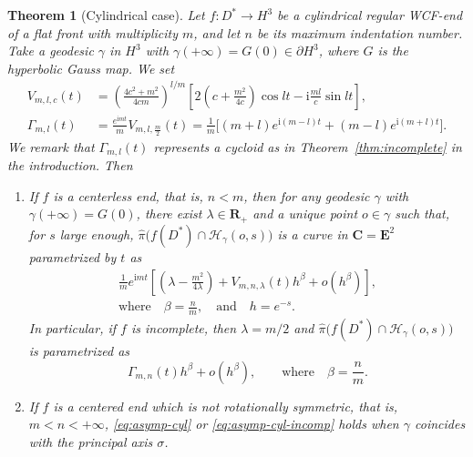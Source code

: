 \documentclass[a4paper]{amsart}
\theoremstyle{plain}
\newtheorem{theorem}{Theorem}[section]
\theoremstyle{remark}
\numberwithin{equation}{section}
\begin{document}
\begin{theorem}[Cylindrical case]\label{thm:cyl}
 Let $f\colon{}D^*\to H^3$ be a cylindrical regular WCF-end
 of a flat front
 with multiplicity $m$, and let $n$ be 
 its maximum indentation number.
 Take a geodesic $\gamma$ in $H^3$ with $\gamma(+\infty)=G(0)\in\partial H^3$,
 where $G$ is the hyperbolic Gauss map.
 We set
 \begin{equation}\label{eq:C}
 \begin{aligned}
    V_{m,l,c}(t) &=
     \left(
       \frac{4c^2+m^2}{4cm}
     \right)^{l/m}
     \left[
      2\left(c+\frac{m^2}{4c}\right)\cos lt - 
       {\mathrm{i}} \frac{ml}{c}\sin lt
     \right],\\
    {\varGamma}_{m,l}(t) &= \frac{e^{{\mathrm{i}} m t}}{m}
                        V_{m,l,\frac{m}{2}}(t)
             = \frac{1}{m}
                \bigl[(m+l)e^{{\mathrm{i}}(m-l)t}+
                      (m-l)e^{{\mathrm{i}}(m+l)t}\bigr].
 \end{aligned}
 \end{equation}
 We remark that ${\varGamma}_{m,l}(t)$ represents a cycloid 
 as in Theorem~\ref{thm:incomplete} in the introduction.
 Then
 \begingroup
 
 
 \begin{enumerate}
  \item\label{item:cyl-1}
       If $f$ is a centerless end, that is, $n<m$, then 
       for any geodesic $\gamma$ with $\gamma(+\infty)=G(0)$,
       there exist  $\lambda\in{\boldsymbol{R}}_+$ and 
       a unique point $o\in \gamma$ 
       such that, 
       for $s$ large enough, 
       $\hat\pi\bigl(f(D^*)\cap{\mathcal{H}}_{\gamma}(o,s)\bigr)$ 
       is a curve in ${\boldsymbol{C}}={\boldsymbol{E}}^2$
       parametrized by $t$ as
       \begin{multline}\label{eq:asymp-cyl}
	\frac{1}{m}e^{{\mathrm{i}} m t}
	 \left[
	  \left(\lambda-\frac{m^2}{4\lambda}\right)
	  +
	  V_{m,n,\lambda}(t)h^{\beta}
	    +o(h^\beta)
	 \right],\\
       \text{where}\quad
         \beta = \frac{n}{m}, \quad \text{and}
         \quad
         h = e^{-s}.
       \end{multline}
       In particular, if $f$ is incomplete, then $\lambda=m/2$ and 
       $\hat\pi\bigl(f(D^*)\cap{\mathcal{H}}_{\gamma}(o,s)\bigr)$ is
       parametrized as
       \begin{equation}\label{eq:asymp-cyl-incomp}
          {\varGamma}_{m,n}(t) h^{\beta}+o(h^{\beta}),
          \qquad \text{where}\quad\beta=\frac{n}{m}.
       \end{equation}
  \item\label{item:cyl-2}
       If $f$ is a centered end
       which is not rotationally symmetric, that is, 
       $m<n<+\infty$, 
       \eqref{eq:asymp-cyl} 
       or \eqref{eq:asymp-cyl-incomp}
       holds when $\gamma$ coincides with  the principal axis $\sigma$. 
 \end{enumerate}
\endgroup
\end{theorem}
\end{document}
